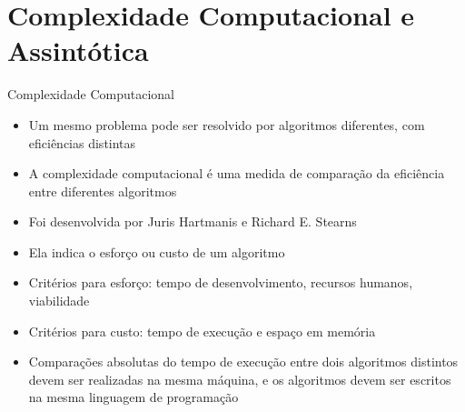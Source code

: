 \section{Complexidade Computacional e Assintótica}

\begin{frame}[fragile]{Complexidade Computacional}

	\begin{itemize}
		\item Um mesmo problema pode ser resolvido por algoritmos diferentes, com eficiências 
        distintas

		\item A complexidade computacional é uma medida de comparação da eficiência entre
        diferentes algoritmos

		\item Foi desenvolvida por Juris Hartmanis e Richard E. Stearns

		\item Ela indica o esforço ou custo de um algoritmo

		\item Critérios para esforço: tempo de desenvolvimento, recursos humanos, viabilidade

		\item Critérios para custo: tempo de execução e espaço em memória

		\item Comparações absolutas do tempo de execução entre dois algoritmos distintos devem ser 
            realizadas na mesma máquina, e os algoritmos devem ser escritos na mesma linguagem de 
            programação
	\end{itemize}

\end{frame}

